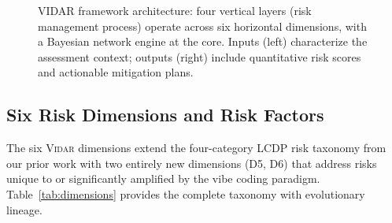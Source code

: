 \documentclass[preprint,review,12pt]{elsarticle}
\newcommand{\vidar}{\textsc{Vidar}}
\begin{document}
\begin{figure}[t]
\caption{VIDAR framework architecture: four vertical layers (risk management process) operate across six horizontal dimensions, with a Bayesian network engine at the core. Inputs (left) characterize the assessment context; outputs (right) include quantitative risk scores and actionable mitigation plans.}
\label{fig:architecture}
\end{figure}


\subsection{Six Risk Dimensions and Risk Factors}
\label{subsec:dimensions}

The six \vidar{} dimensions extend the four-category LCDP risk taxonomy from our prior work \cite{hathnagoda2024assessing} with two entirely new dimensions (D5, D6) that address risks unique to or significantly amplified by the vibe coding paradigm. Table~\ref{tab:dimensions} provides the complete taxonomy with evolutionary lineage.
\end{document}

